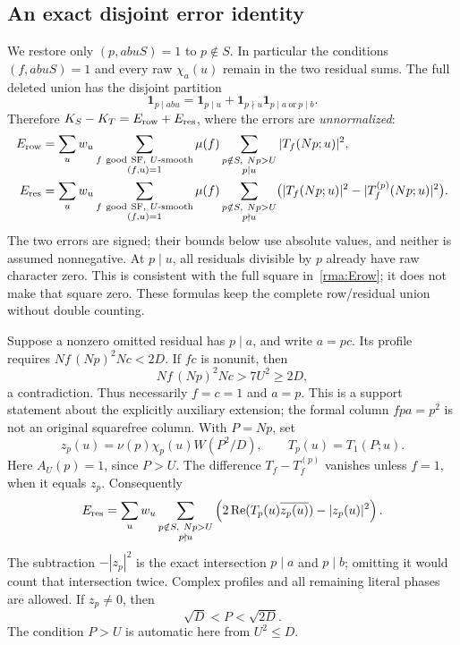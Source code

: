 \subsection{An exact disjoint error identity}
We restore only $(p,abuS)=1$ to $p\notin S$. In particular the conditions
$(f,abuS)=1$ and every raw $\chi_a(u)$ remain in the two residual sums.
The full deleted union has the disjoint partition
\begin{equation}\label{rma:union}
 \mathbf1_{p\mid abu}=\mathbf1_{p\mid u}
       +\mathbf1_{p\nmid u}\mathbf1_{p\mid a\ \mathrm{or}\ p\mid b}.
\end{equation}
Therefore $K_S-K_T=E_{\rm row}+E_{\rm res}$, where the errors are
\emph{unnormalized}:
\begin{align}
 E_{\rm row}
 &=\sum_u w_u\sum_{\substack{f\ \mathrm{good\ SF},\ U\text{-smooth}\\
                            (f,u)=1}}\mu(f)
        \sum_{\substack{p\notin S,\ Np>U\\p\mid u}}
                  |T_f(Np;u)|^2,\label{rma:Erow}\\
 E_{\rm res}
 &=\sum_u w_u\sum_{\substack{f\ \mathrm{good\ SF},\ U\text{-smooth}\\
                            (f,u)=1}}\mu(f)
        \sum_{\substack{p\notin S,\ Np>U\\p\nmid u}}
       \bigl(|T_f(Np;u)|^2-|T_f^{(p)}(Np;u)|^2\bigr).
       \label{rma:Eres}
\end{align}
The two errors are signed; their bounds below use absolute values,
and neither is assumed nonnegative.
At $p\mid u$, all residuals divisible by $p$ already have raw character
zero. This is consistent with the full square in~\eqref{rma:Erow}; it
does not make that square zero. These formulas keep the complete
row/residual union without double counting.

Suppose a nonzero omitted residual has $p\mid a$, and write $a=pc$.
Its profile requires $Nf\,(Np)^2Nc<2D$. If $fc$ is nonunit, then
\[
 Nf\,(Np)^2Nc>7U^2\ge2D,
\]
a contradiction. Thus necessarily $f=c=1$ and $a=p$. This is a support
statement about the explicitly auxiliary extension; the formal column
$fpa=p^2$ is not an original squarefree column. With $P=Np$, set
\begin{equation}\label{rma:z}
 z_p(u)=\nu(p)\chi_p(u)W(P^2/D),\qquad T_p(u)=T_1(P;u).
\end{equation}
Here $A_U(p)=1$, since $P>U$. The difference $T_f-T_f^{(p)}$ vanishes
unless $f=1$, when it equals $z_p$. Consequently
\begin{equation}\label{rma:res-exact}
 E_{\rm res}=\sum_u w_u
       \sum_{\substack{p\notin S,\ Np>U\\p\nmid u}}
       \left(2\operatorname{Re}(T_p(u)\overline{z_p(u)})
                         -|z_p(u)|^2\right).
\end{equation}
The subtraction $-|z_p|^2$ is the exact intersection
$p\mid a$ and $p\mid b$; omitting it would count that intersection
twice. Complex profiles and all remaining literal phases are allowed.
If $z_p\ne0$, then
\begin{equation}\label{rma:zsupport}
 \sqrt D<P<\sqrt{2D}.
\end{equation}
The condition $P>U$ is automatic here from $U^2\le D$.

